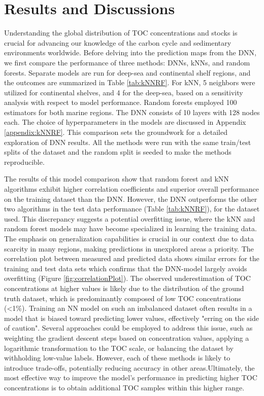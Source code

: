 \documentclass[journal abbreviation, manuscript]{copernicus}
\begin{document}
%


\section{Results and Discussions}
Understanding the global distribution of TOC concentrations and stocks is crucial for advancing our knowledge of the carbon cycle and sedimentary environments worldwide. Before delving into the prediction maps from the DNN, we first compare the performance of three methods: DNNs, kNNs, and random forests. Separate models are run for deep-sea and continental shelf regions, and the outcomes are summarized in Table \ref{tab:kNNRF}. For kNN, 5 neighbors were utilized for continental shelves, and 4 for the deep-sea, based on a sensitivity analysis with respect to model performance. Random forests employed 100 estimators for both marine regions. The DNN consists of 10 layers with 128 nodes each. The choice of hyperparameters in the models are discussed in Appendix \ref{appendix:kNNRF}. This comparison sets the groundwork for a detailed exploration of DNN results. All the methods were run with the same train/test splits of the dataset and the random split is seeded to make the methods reproducible. 

The results of this model comparison show that random forest and kNN algorithms exhibit higher correlation coefficients and superior overall performance on the training dataset than the DNN. However, the DNN outperforms the other two algorithms in the test data performance (Table \ref{tab:kNNRF}), for the dataset used. This discrepancy suggests a potential overfitting issue, where the kNN and random forest models may have become specialized in learning the training data. The emphasis on generalization capabilities is crucial in our context due to data scarcity in many regions, making predictions in unexplored  areas a priority. The correlation plot between measured and predicted data shows similar errors for the training and test data sets which confirms that the DNN-model largely avoids overfitting (Figure \ref{fig:correlationPlot}). The observed underestimation of TOC concentrations at higher values is likely due to the distribution of the ground truth dataset, which is predominantly composed of low TOC concentrations (<1\%). Training an NN model on such an imbalanced dataset often results in a model that is biased toward predicting lower values, effectively "erring on the side of caution". 
Several approaches could be employed to address this issue, such as weighting the gradient descent steps based on concentration values, applying a logarithmic transformation to the TOC scale, or balancing the dataset by withholding low-value labels. However, each of these methods is likely to introduce trade-offs, potentially reducing accuracy in other areas.Ultimately, the most effective way to improve the model's performance in predicting higher TOC concentrations is to obtain additional TOC samples within this higher range.
\end{document}
